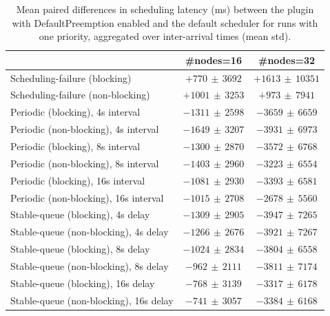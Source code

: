 \begin{table}[t]
\tiny
\setlength{\tabcolsep}{1.2pt}
\renewcommand{\arraystretch}{1.12}
\centering
\caption{Mean paired differences in scheduling latency (ms) between the plugin with DefaultPreemption enabled and the default scheduler for runs with one priority, aggregated over inter-arrival times (mean \pm std).}
\label{tab:latency-defpreempt1-prio1-std1-agg-arrival}
\begin{tabular}{l c c}
\toprule
 & \#nodes=16 & \#nodes=32 \\
\midrule
Scheduling-failure (blocking) & $+770\,\pm\,3692$ & $+1613\,\pm\,10351$ \\
Scheduling-failure (non-blocking) & $+1001\,\pm\,3253$ & $+973\,\pm\,7941$ \\
Periodic (blocking), 4s interval & $-1311\,\pm\,2598$ & $-3659\,\pm\,6659$ \\
Periodic (non-blocking), 4s interval & $-1649\,\pm\,3207$ & $-3931\,\pm\,6973$ \\
Periodic (blocking), 8s interval & $-1300\,\pm\,2870$ & $-3572\,\pm\,6768$ \\
Periodic (non-blocking), 8s interval & $-1403\,\pm\,2960$ & $-3223\,\pm\,6554$ \\
Periodic (blocking), 16s interval & $-1081\,\pm\,2930$ & $-3393\,\pm\,6581$ \\
Periodic (non-blocking), 16s interval & $-1015\,\pm\,2708$ & $-2678\,\pm\,5560$ \\
Stable-queue (blocking), 4s delay & $-1309\,\pm\,2905$ & $-3947\,\pm\,7265$ \\
Stable-queue (non-blocking), 4s delay & $-1266\,\pm\,2676$ & $-3921\,\pm\,7267$ \\
Stable-queue (blocking), 8s delay & $-1024\,\pm\,2834$ & $-3804\,\pm\,6558$ \\
Stable-queue (non-blocking), 8s delay & $-962\,\pm\,2111$ & $-3811\,\pm\,7174$ \\
Stable-queue (blocking), 16s delay & $-768\,\pm\,3139$ & $-3317\,\pm\,6178$ \\
Stable-queue (non-blocking), 16s delay & $-741\,\pm\,3057$ & $-3384\,\pm\,6168$ \\
\bottomrule
\end{tabular}
\end{table}
